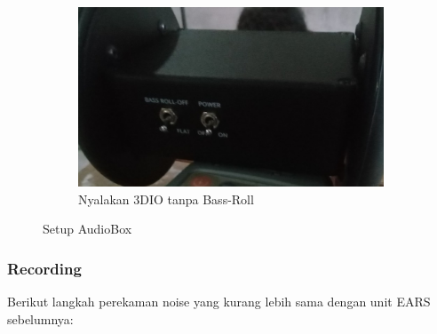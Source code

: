 \documentclass{article}
\begin{document}
\begin{figure}[H]
\begin{subfigure}[]{.4\textwidth}
			\includegraphics[width=\textwidth,angle=0]{images/3dio_unit_on}
			\caption{Nyalakan 3DIO tanpa Bass-Roll}
		\end{subfigure}
		\caption{Setup AudioBox}
	\end{figure}

	\subsubsection{Recording}
	
	Berikut langkah perekaman noise yang kurang lebih sama dengan unit EARS sebelumnya:
	
\end{document}
